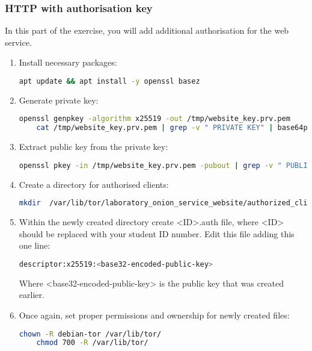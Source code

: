 \subsubsection{HTTP with authorisation key}
In this part of the exercise, you will add additional authorisation for the web service.
\begin{enumerate}
    \item Install necessary packages:
    \begin{lstlisting}[language=bash]
    apt update && apt install -y openssl basez
    \end{lstlisting}
    \item Generate private key:
    \begin{lstlisting}[language=bash, breaklines=true, breakatwhitespace=true]
    openssl genpkey -algorithm x25519 -out /tmp/website_key.prv.pem
    cat /tmp/website_key.prv.pem | grep -v " PRIVATE KEY" | base64pem -d | tail --bytes=32 | base32 | sed 's/=//g' > /tmp/website_key.prv.key
    \end{lstlisting}
    \item Extract public key from the private key:
    \begin{lstlisting}[language=bash, breaklines=true, breakatwhitespace=true]
    openssl pkey -in /tmp/website_key.prv.pem -pubout | grep -v " PUBLIC KEY" | base64pem -d | tail --bytes=32 | base32 | sed 's/=//g' > /tmp/website_key.pub.key
    \end{lstlisting}
    \item Create a directory for authorised clients:
    \begin{lstlisting}[language=bash, breaklines=true, breakatwhitespace=true, columns=flexible]
    mkdir  /var/lib/tor/laboratory_onion_service_website/authorized_clients/
    \end{lstlisting}
    \item Within the newly created directory create <ID>.auth file, where <ID> should be replaced with your student ID number. Edit this file adding this one line:
    \begin{lstlisting}[language=bash]
    descriptor:x25519:<base32-encoded-public-key>
    \end{lstlisting}
    Where <base32-encoded-public-key> is the public key that was created earlier.
    \item Once again, set proper permissions and ownership for newly created files:
    \begin{lstlisting}[language=bash]
    chown -R debian-tor /var/lib/tor/
    chmod 700 -R /var/lib/tor/

\end{lstlisting}
\end{enumerate}
